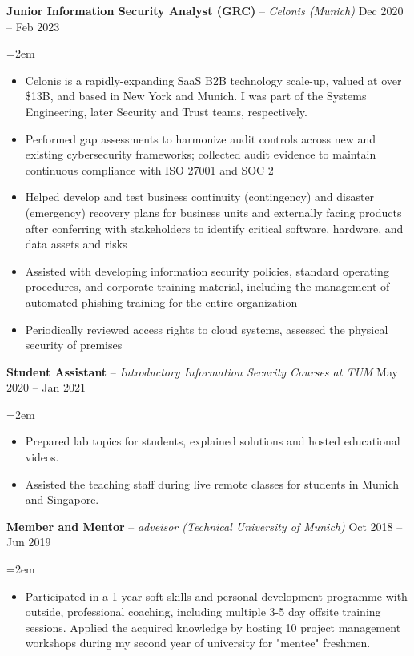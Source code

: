 \documentclass[paper=a4,fontsize=11pt]{scrartcl}
\newcommand{\sepspace}{\vspace*{0.35em}}		%
\newcommand{\EducationEntry}[4]{
		\noindent \textit{#1} \hfill      %
		\colorbox{custom_gray}{\color{white}#2} \par  %
		\noindent\hangindent=2em\hangafter=0 \small #3 %
		\normalsize \par}
\newcommand{\WorkEntry}[4]{				  %
		\noindent \textbf{#1} – \textit{#3} \hfill      %
		\colorbox{custom_gray}{\color{white}#2} \par  %
		\noindent\hangindent=2em\hangafter=0 \small #4 %
		\normalsize \par}
\begin{document}
\WorkEntry{Junior Information Security Analyst (GRC)}{Dec 2020 – Feb 2023}{Celonis (Munich)}
{
\begin{itemize}
  \item Celonis is a rapidly-expanding SaaS B2B technology scale-up, valued at over \$13B, and based in New York and Munich. I was part of the Systems Engineering, later Security and Trust teams, respectively.
  \item Performed gap assessments to harmonize audit controls across new and existing cybersecurity frameworks; collected audit evidence to maintain continuous compliance with ISO 27001 and SOC 2
  \item Helped develop and test business continuity (contingency) and disaster (emergency) recovery plans for business units and externally facing products after conferring with stakeholders to identify critical software, hardware, and data assets and risks
  \item Assisted with developing information security policies, standard operating procedures, and corporate training material, including the management of automated phishing training for the entire organization
  \item Periodically reviewed access rights to cloud systems, assessed the physical security of premises
\end{itemize}
}

\WorkEntry{Student Assistant}{May 2020 – Jan 2021}{Introductory Information Security Courses at TUM}
{
\begin{itemize}
  \item Prepared lab topics for students, explained solutions and hosted educational videos.
  \item Assisted the teaching staff during live remote classes for students in Munich and Singapore.
\end{itemize}
}

\WorkEntry{Member and Mentor}{Oct 2018 – Jun 2019}{adveisor (Technical University of Munich)}
{
\begin{itemize}
	\item Participated in a 1-year soft-skills and personal development programme with outside, professional coaching, including multiple 3-5 day offsite training sessions. Applied the acquired knowledge by hosting 10 project management workshops during my second year of university for "mentee" freshmen.
\end{itemize}
}

\end{document}
